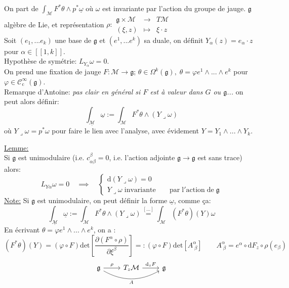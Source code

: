 \documentclass[a4paper,11pt]{article}
\renewcommand{\d}{{\mathrm{d}}}
\newcommand{\dr}[2]{\frac{\partial {#1}}{\partial{#2}}}
\begin{document}
On part de $\int_{\mathcal M} F^*\theta\wedge p^*\underline\omega$ où $\omega$ est invariante par l'action du groupe de jauge. $\mathfrak{g}$ algèbre de Lie, et représentation $\rho: \begin{matrix}
\mathfrak g\times\mathcal M & \to & T\mathcal M\\
(\xi,z) & \mapsto & \xi \cdot z
\end{matrix}$\\
Soit $(e_1, ...e_k)$ une base de $\mathfrak g$ et $(e^1, ...e^k)$ sa duale, on définit $Y_\alpha(z) = e_\alpha\cdot z$ pour $\alpha \in [\![1,k]\!]$.\\
Hypothèse de symétrie: $\boxed{L_{Y_\alpha}\omega=0}$.\\
On prend une fixation de jauge $F:\mathcal{M}\to \mathfrak{g}$; $\theta \in \Omega^k(\mathfrak g),\; \theta = \varphi e^1\wedge...\wedge e^k$ pour $\varphi\in\mathcal{C}^\infty_\mathrm{c}(\mathfrak g)$.\\
Remarque d'Antoine: \emph{pas clair en général si $F$ est à valeur dans $G$ ou $\mathfrak g$...} on peut alors définir:
$$\int_{\underline{\mathcal M}} \underline\omega := \int_\mathcal M F^*\theta \wedge (Y\lrcorner \omega)$$
où $Y\lrcorner\omega = p^*\omega$ pour faire le lien avec l'analyse, avec évidement $Y=Y_1\wedge...\wedge Y_k$.

\noindent \underline{Lemme:}\\
Si $\mathfrak g$ est unimodulaire (i.e. $c^\beta_{\alpha\beta}=0$, i.e. l'action adjointe $\mathfrak g\to\mathfrak g$ est sans trace) alors:
$$L_{Y\alpha}\omega = 0 \quad \implies\quad
\left\{
\begin{matrix}
\d(Y\lrcorner\omega)=0\quad \;\;\,&\\
Y\lrcorner \omega \; \mathrm{invariante}&
\!\!\! \mathrm{par}\;\mathrm l'\mathrm{action}\;\mathrm{de}\;\mathfrak g
\end{matrix}
\right.$$
\underline{Note:} Si $\mathfrak g$ est unimodulaire, on peut définir la forme $\underline \omega$, comme ça:
$$\int_{\underline{\mathcal M}} \underline\omega := \int_\mathcal M F^*\theta \wedge (Y\lrcorner \omega) \overset{[...]}= \int_\mathcal M (F^*\theta) (Y) \omega$$
En écrivant $\theta = \varphi e^1\wedge...\wedge e^k$, on a :
$$(F^*\theta)(Y) = (\varphi\circ F) \mathrm{det}\left[\dr{(F^\alpha\circ \rho)}{\xi^\beta}\right]=: (\varphi\circ F) \mathrm{det}[A^\alpha_{\;\beta}] \quad \quad A^\alpha_{\;\beta} = e^\alpha \circ \d F_z \circ \rho(e_\beta)$$
$$\begin{tikzcd}
\mathfrak{g}\arrow[r, "\rho"]\arrow[rr,"A",bend right=30,swap] & T_z\mathcal M \arrow[r,"\d_zF"] & \mathfrak{g}
\end{tikzcd}$$
\end{document}
